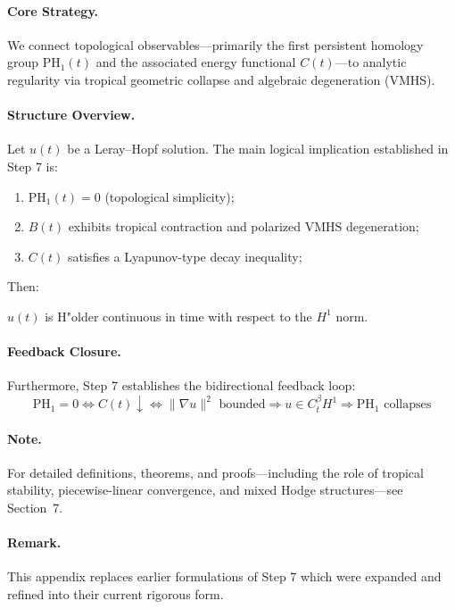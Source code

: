 \documentclass[11pt]{article}
\theoremstyle{definition}
\begin{document}
\paragraph{Core Strategy.}
We connect topological observables—primarily the first persistent homology group $\mathrm{PH}_1(t)$ and the associated energy functional $C(t)$—to analytic regularity via tropical geometric collapse and algebraic degeneration (VMHS).

\paragraph{Structure Overview.}
Let $u(t)$ be a Leray--Hopf solution. The main logical implication established in Step 7 is:
\begin{enumerate}
  \item $\mathrm{PH}_1(t) = 0$ (topological simplicity);
  \item $B(t)$ exhibits tropical contraction and polarized VMHS degeneration;
  \item $C(t)$ satisfies a Lyapunov-type decay inequality;
\end{enumerate}
Then:
\begin{center}
$u(t)$ is H"older continuous in time with respect to the $H^1$ norm.
\end{center}

\paragraph{Feedback Closure.}
Furthermore, Step 7 establishes the bidirectional feedback loop:
\[
\mathrm{PH}_1 = 0 \Leftrightarrow C(t) \downarrow \Leftrightarrow \|\nabla u\|^2 \text{ bounded} \Rightarrow u \in C^{\beta}_t H^1 \Rightarrow \mathrm{PH}_1 \text{ collapses}
\]

\paragraph{Note.} For detailed definitions, theorems, and proofs—including the role of tropical stability, piecewise-linear convergence, and mixed Hodge structures—see Section~7.

\paragraph{Remark.} This appendix replaces earlier formulations of Step 7 which were expanded and refined into their current rigorous form.

\end{document}
